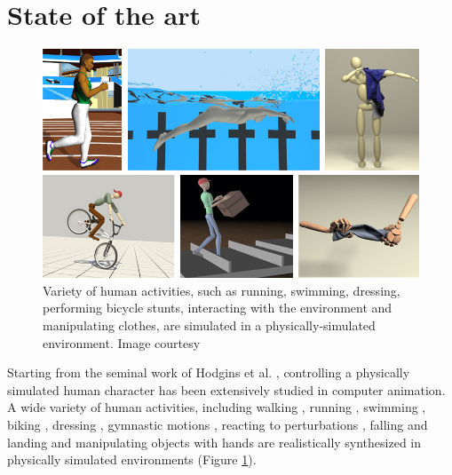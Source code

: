\section{State of the art}

\begin{figure}[h]
  \centering
  \includegraphics[width=\textwidth]{figures/teaser2.jpg}
  \caption{Variety of human activities, such as running, swimming, dressing, performing bicycle stunts, interacting with the environment and manipulating clothes, are simulated in a physically-simulated environment. Image courtesy \cite{Hodgins:1995:AHA,Si:2014,Clegg:2015,Tan:2014,Coros2010,Bai:2014}}
  \label{fig:teaser}
\end{figure}

Starting from the seminal work of Hodgins et al. \cite{Hodgins:1995:AHA}, controlling a physically simulated human character has been extensively studied in computer animation. A wide variety of human activities, including walking \cite{Yin:2007}, running \cite{Kwon:2010}, swimming \cite{kwatra2009fluid,Si:2014}, biking \cite{Tan:2014}, dressing \cite{Clegg:2015}, gymnastic motions \cite{Hodgins:1995:AHA}, reacting to perturbations \cite{Wang:2010}, falling and landing \cite{HA:2012:FLM} and manipulating objects with hands \cite{Liu:2009:DMF,Ye:2012,Bai:2014} are realistically synthesized in physically simulated environments (Figure \ref{fig:teaser}). 

